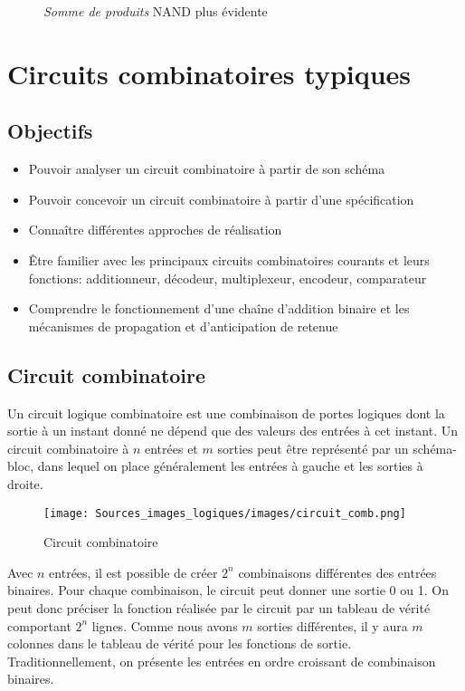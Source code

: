 \documentclass[11pt]{article}
\begin{document}
\begin{figure}[htbp]
\centering

\caption{\label{fig:org8b40521}\emph{Somme de produits} NAND plus évidente}
\end{figure}

\section{Circuits combinatoires typiques}
\label{sec:orgf7b3d33}
\subsection{Objectifs}
\label{sec:orgef5883d}
\begin{itemize}
\item Pouvoir analyser un circuit combinatoire à partir de son schéma
\item Pouvoir concevoir un circuit combinatoire à partir d'une spécification
\item Connaître différentes approches de réalisation
\item Être familier avec les principaux circuits combinatoires courants et
leurs fonctions: additionneur, décodeur, multiplexeur, encodeur,
comparateur
\item Comprendre le fonctionnement d'une chaîne d'addition binaire et les
mécanismes de propagation et d'anticipation de retenue
\end{itemize}

\subsection{Circuit combinatoire}
\label{sec:orge3c662a}

Un circuit logique combinatoire est une combinaison de portes logiques
dont la sortie à un instant donné ne dépend que des valeurs des
entrées à cet instant. Un circuit combinatoire à \(n\) entrées et
\(m\) sorties peut être représenté par un schéma-bloc, dans lequel on
place généralement les entrées à gauche et les sorties à droite.

\begin{figure}[htbp]
\centering
\texttt{[image: Sources\_images\_logiques/images/circuit\_comb.png]}
\caption{\label{fig:org289b406}Circuit combinatoire}
\end{figure}

Avec \(n\) entrées, il est possible de créer \(2^n\) combinaisons
différentes des entrées binaires. Pour chaque combinaison, le circuit
peut donner une sortie 0 ou 1. On peut donc préciser la fonction
réalisée par le circuit par un tableau de vérité comportant \(2^n\)
lignes. Comme nous avons \(m\) sorties différentes, il y aura \(m\)
colonnes dans le tableau de vérité pour les fonctions de
sortie. Traditionnellement, on présente les entrées en ordre croissant
de combinaison binaires.
\end{document}
